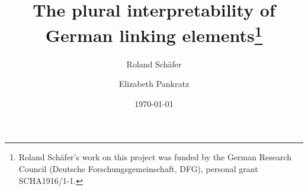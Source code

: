 

\smartqed

\journalname{}
\title{The plural interpretability of German linking elements\thanks{Roland Schäfer's work on this project was funded by the German Research Council (Deutsche Forschungsgemeinschaft, DFG), personal grant SCHA1916/1-1.}}
\author{Roland Schäfer \and Elizabeth Pankratz}
\date{\today}

\newcommand{\TheDOI}{\url{https://doi.org/10.5281/zenodo.1323211}}
\newcommand{\TheUniversity}{Freie Universität Berlin}
